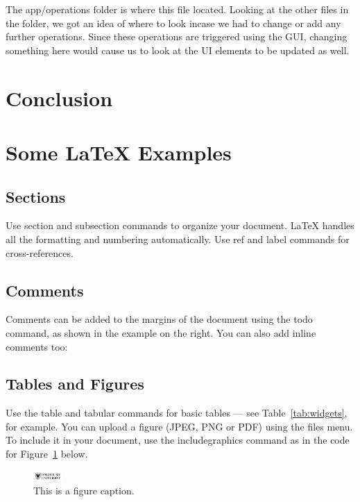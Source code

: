The app/operations folder is where this file located. Looking at the other files in the folder, we got an idea of where to look incase we had to change or add any further operations. Since these operations are triggered using the GUI, changing something here would cause us to look at the UI elements to be updated as well.

\section{Conclusion}
\section{Some \LaTeX{} Examples}
\label{sec:examples}
\subsection{Sections}

Use section and subsection commands to organize your document. \LaTeX{} handles all the formatting and numbering automatically. Use ref and label commands for cross-references.

\subsection{Comments}

Comments can be added to the margins of the document using the  todo command, as shown in the example on the right. You can also add inline comments too:


\subsection{Tables and Figures}

Use the table and tabular commands for basic tables --- see Table~\ref{tab:widgets}, for example. You can upload a figure (JPEG, PNG or PDF) using the files menu. To include it in your document, use the includegraphics command as in the code for Figure~\ref{fig:frog} below.

\begin{figure}
\centering
\includegraphics[width=0.1\textwidth]{dal.jpg}
\caption{\label{fig:frog}This is a figure caption.}
\end{figure}


